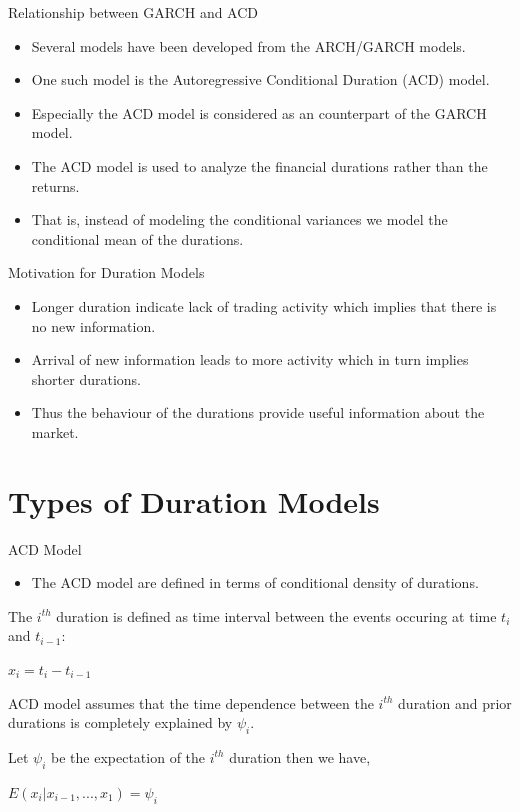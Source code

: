 \documentclass[
  ignorenonframetext,
]{beamer}
\providecommand{\tightlist}{%
  \setlength{\itemsep}{0pt}\setlength{\parskip}{0pt}}
\begin{document}
\begin{frame}{Relationship between GARCH and ACD}
\protect\hypertarget{relationship-between-garch-and-acd}{}
\begin{itemize}
\item
  Several models have been developed from the ARCH/GARCH models.
\item
  One such model is the Autoregressive Conditional Duration (ACD) model.
\item
  Especially the ACD model is considered as an counterpart of the GARCH
  model.
\item
  The ACD model is used to analyze the financial durations rather than
  the returns.
\item
  That is, instead of modeling the conditional variances we model the
  conditional mean of the durations.
\end{itemize}
\end{frame}

\begin{frame}{Motivation for Duration Models}
\protect\hypertarget{motivation-for-duration-models}{}
\begin{itemize}
\item
  Longer duration indicate lack of trading activity which implies that
  there is no new information.
\item
  Arrival of new information leads to more activity which in turn
  implies shorter durations.
\item
  Thus the behaviour of the durations provide useful information about
  the market.
\end{itemize}
\end{frame}

\hypertarget{types-of-duration-models}{%
\section{Types of Duration Models}\label{types-of-duration-models}}

\begin{frame}{ACD Model}
\protect\hypertarget{acd-model}{}
\begin{itemize}
\tightlist
\item
  The ACD model are defined in terms of conditional density of
  durations.
\end{itemize}

The \(i^{th}\) duration is defined as time interval between the events
occuring at time \(t_i\) and \(t_{i-1}\):

\(x_i = t_i - t_{i-1}\)

ACD model assumes that the time dependence between the \(i^{th}\)
duration and prior durations is completely explained by \(\psi_i\).

Let \(\psi_i\) be the expectation of the \(i^{th}\) duration then we
have,

\(E(x_i | x_{i-1}, ..., x_1) = \psi_i\)
\end{frame}
\end{document}
